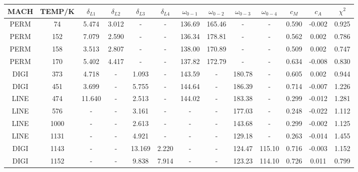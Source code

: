 \begin{sidewaystable}[h]
\centering
\begin{tabular}{ccccccccccccc}
\toprule
    MACH &  TEMP/K &  $\delta_{L1}$ &  $\delta_{L2}$ &  $\delta_{L3}$ &  $\delta_{L4}$  & $\omega_{0-1}$ &   $\omega_{0-2}$ &   $\omega_{0-3}$ &   $\omega_{0-4}$ & $c_M$ &  $c_A$ &  $\chi^{2}$ \\
\midrule
PERM &      74  &       5.474 &       3.012 &         - &         -  & 136.69 & 165.46 &    - &    - &      0.590 &   -0.002 &      0.925 \\
PERM &     152  &       7.079 &       2.590 &         - &         -  & 136.34 & 178.81 &    - &    - &      0.562 &    0.002 &      0.786 \\
PERM &     158  &       3.513 &       2.807 &         - &         -  & 138.00 & 170.89 &    - &    - &      0.509 &    0.002 &      0.747 \\
PERM &     170  &       5.402 &       4.417 &         - &         -  & 137.82 & 172.79 &    - &    - &      0.634 &   -0.008 &      0.830 \\
DIGI &     373  &       4.718 &         - &       1.093 &         -  & 143.59 &    - & 180.78 &    - &      0.605 &    0.002 &      0.944 \\
DIGI &     451  &       3.699 &         - &       5.755 &         -  & 144.64 &    - & 186.39 &    - &      0.714 &   -0.007 &      1.226 \\
LINE &     474  &      11.640 &         - &       2.513 &         -  & 144.02 &    - & 183.38 &    - &      0.299 &   -0.012 &      1.281 \\
LINE &     576  &         - &         - &       3.161 &         -  &    - &    - & 177.03 &    - &      0.248 &   -0.022 &      1.112 \\
LINE &    1000  &         - &         - &       2.613 &         -  &    - &    - & 143.68 &    - &      0.299 &   -0.002 &      1.125 \\
LINE &    1131  &         - &         - &       4.921 &         -  &    - &    - & 129.18 &    - &      0.263 &   -0.014 &      1.455 \\
DIGI &    1143  &         - &         - &      13.169 &       2.220  &    - &    - & 124.47 & 115.10 &      0.716 &   -0.003 &      1.152 \\
DIGI &    1152  &         - &         - &       9.838 &       7.914  &    - &    - & 123.23 & 114.10 &      0.726 &    0.011 &      0.799 \\

\end{tabular}
\end{sidewaystable}
